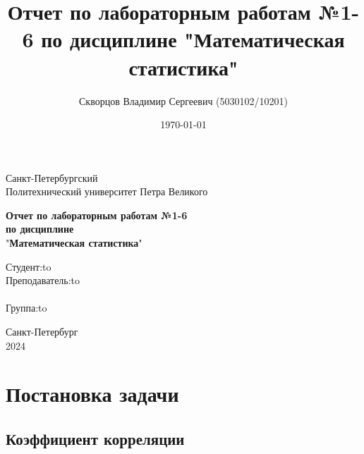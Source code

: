 \documentclass[12pt,a4paper]{article}
\title{Отчет по лабораторным работам №1-6 по дисциплине
	"Математическая статистика"}
\author{Скворцов Владимир Сергеевич (5030102/10201)}
\date{\today}
\begin{document}
	\begin{titlepage}

		\Large

		\begin{center}
			Санкт-Петербургский \\ Политехнический университет Петра Великого

			\vspace{10em}

			\textbf{Отчет по лабораторным работам №1-6} \\
			\textbf{по дисциплине}\\
			"\textbf{Математическая статистика}"

			\vspace{2em}

		\end{center}

		\vspace{6em}

		\newbox{\lbox}
		\newlength{\maxl}
		\setlength{\maxl}{\wd\lbox}
		\hfill\parbox{12cm}{
			\hspace*{3cm}\hspace*{-5cm}Студент:\hfill\hbox to\\
			\hspace*{3cm}\hspace*{-5cm}Преподаватель:\hfill\hbox to\\
			\\
			\hspace*{3cm}\hspace*{-5cm}Группа:\hfill\hbox to\\
		}

		\vspace{\fill}

		\begin{center}
			Санкт-Петербург \\ 2024
		\end{center}

	\end{titlepage}

	\tableofcontents

	\newpage

	\section{Постановка задачи}

	\subsection{Коэффициент корреляции}
\end{document}
